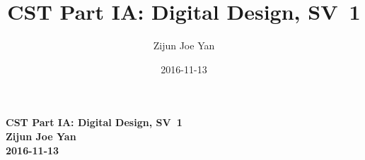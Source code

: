 \documentclass[10pt,twoside,a4paper]{article}
\newcommand{\studentname}{Zijun Joe Yan}
\newcommand{\svworkdate}{2016-11-13}
\newcommand{\svcourse}{CST Part IA: Digital Design}
\newcommand{\svnumber}{1}
\begin{document}
\author{\studentname}
\title{\svcourse, SV~\svnumber}
\date{\svworkdate}

\textbf{\svcourse, SV~\svnumber}\\
\textbf{\studentname}\\
\textbf{\svworkdate}\\

%

\end{document}
